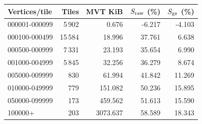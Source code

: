 \begingroup\small\setlength{\tabcolsep}{3pt}
\begin{longtable}{lrrrr}
\toprule
Vertices/tile & Tiles & MVT KiB & $S_{\rm raw}$ (\%) & $S_{\rm gz}$ (\%) \\
\midrule
000001-000099 & 5\,902 & 0.676 & -6.217 & -4.103 \\
000100-000499 & 15\,584 & 18.996 & 37.761 & 6.638 \\
000500-000999 & 7\,331 & 23.193 & 35.654 & 6.990 \\
001000-004999 & 5\,845 & 32.256 & 36.279 & 8.674 \\
005000-009999 & 830 & 61.994 & 41.842 & 11.269 \\
010000-049999 & 779 & 151.082 & 50.236 & 15.895 \\
050000-099999 & 173 & 459.562 & 51.613 & 15.590 \\
100000+ & 203 & 3073.637 & 58.589 & 18.343 \\
\bottomrule
\end{longtable}
\endgroup
